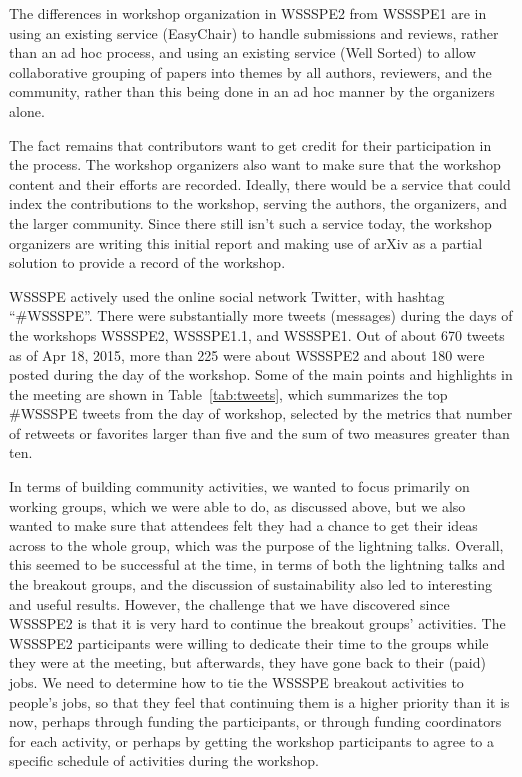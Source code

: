 \documentclass[11pt, oneside]{amsart}
\begin{document}
The differences in workshop organization in WSSSPE2 from WSSSPE1
are in using an existing service (EasyChair) to handle submissions and reviews,
rather than an ad hoc process, and using an existing service (Well Sorted) to
allow collaborative grouping of papers into themes by all authors, reviewers,
and the community, rather than this being done in an ad hoc manner by the
organizers alone.

The fact remains that contributors want to get credit for their
participation in the process. The workshop organizers also want to make
sure that the workshop content and their efforts are recorded. Ideally, there
would be a service that could index the contributions to the
workshop, serving the authors, the organizers, and the larger community. 
Since there still isn't such a service today, the workshop organizers are
writing this initial report and making use of arXiv as a partial solution to
provide a record of the workshop.

WSSSPE actively used the online social network Twitter, with hashtag
``\#WSSSPE''. There were substantially more tweets (messages) during the days of
the workshops WSSSPE2, WSSSPE1.1, and WSSSPE1. Out of about 670 tweets as of Apr
18, 2015, more than 225 were about WSSSPE2 and about 180 were posted during the
day of the workshop. Some of the main points and highlights in the meeting are
shown in Table~\ref{tab:tweets}, which summarizes the top \#WSSSPE tweets from
the day of workshop, selected by the metrics that number of retweets or
favorites larger than five and the sum of two measures greater than ten.

In terms of building community activities, we wanted to focus primarily on
working groups, which we were able to do, as discussed above, but we
also wanted to make sure that attendees felt they had a chance to get their
ideas across to the whole group, which was the purpose of the lightning talks.
Overall, this seemed to be successful at the time, in terms of both the lightning
talks and the breakout groups, and the discussion of sustainability also led
to interesting and useful results. However, the challenge that we have discovered
since WSSSPE2 is that it is very hard to continue the breakout groups'
activities.  The WSSSPE2 participants were willing to dedicate their time to
the groups while they were at the meeting, but afterwards, they have gone
back to their (paid) jobs.  We need to determine how to tie the WSSSPE
breakout activities to people's jobs, so that they feel that continuing them
is a higher priority than it is now, perhaps through funding the participants,
or through funding coordinators for each activity, or perhaps by getting
the workshop participants to agree to a specific schedule of activities during the
workshop.
\end{document}
